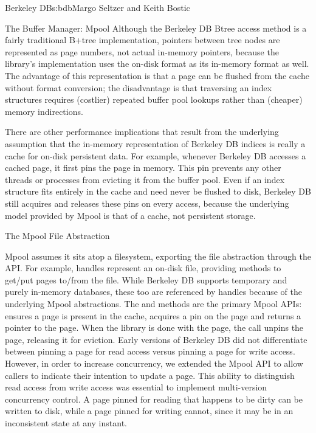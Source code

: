 \begin{aosachapter}{Berkeley DB}{s:bdb}{Margo Seltzer and Keith Bostic}
\begin{aosasect1}{The Buffer Manager: Mpool}
Although the Berkeley DB Btree access method is a fairly traditional
B+tree implementation, pointers between tree nodes are represented as
page numbers, not actual in-memory pointers, because the library's
implementation uses the on-disk format as its in-memory format
as well. The advantage of this representation is that a page can be
flushed from the cache without format conversion; the disadvantage is
that traversing an index structures requires (costlier) repeated
buffer pool lookups rather than (cheaper) memory indirections.

There are other performance implications that result from the
underlying assumption that the in-memory representation of Berkeley DB
indices is really a cache for on-disk persistent data. For example,
whenever Berkeley DB accesses a cached page, it first pins the page in
memory. This pin prevents any other threads or processes from 
evicting it from the buffer pool. Even if an index
structure fits entirely in the cache and need never be flushed to
disk, Berkeley DB still acquires and releases these pins on every
access, because the underlying model provided by Mpool is that of a
cache, not persistent storage.

\begin{aosasect2}{The Mpool File Abstraction}

Mpool assumes it sits atop a filesystem, exporting the file
abstraction through the API\@. For example,  handles
represent an on-disk file, providing methods to get/put pages to/from
the file.  While Berkeley DB supports temporary and purely in-memory
databases, these too are referenced by  handles
because of the underlying Mpool abstractions. The  and
 methods are the primary Mpool APIs:  ensures a
page is present in the cache, acquires a pin on the page and returns a
pointer to the page.  When the library is done with the page, the
 call unpins the page, releasing it for 
eviction.  Early versions of Berkeley DB did not differentiate between
pinning a page for read access versus pinning a page for write
access. However, in order to increase concurrency, we extended the
Mpool API to allow callers to indicate their intention to update a
page. This ability to distinguish read access from write access was
essential to implement multi-version concurrency control.
A page pinned for reading that happens to be dirty can be written to
disk, while a page pinned for writing cannot, since it may be in an
inconsistent state at any instant.


\end{aosasect2}
\end{aosasect1}
\end{aosachapter}
